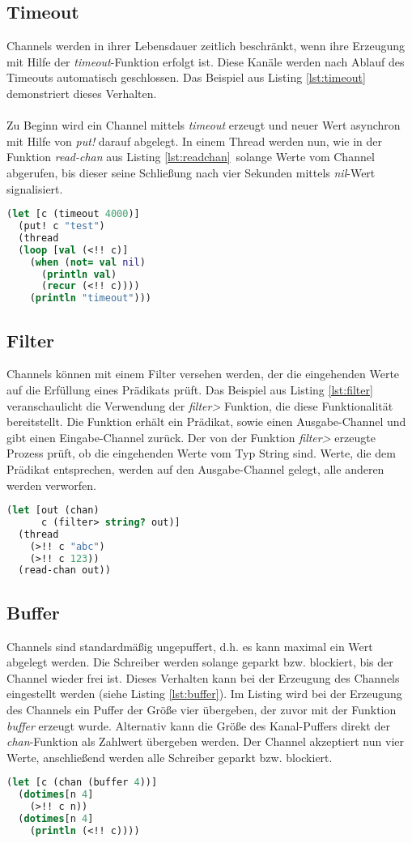 \subsection{Timeout}
Channels werden in ihrer Lebensdauer zeitlich beschränkt, wenn ihre Erzeugung mit Hilfe der \textit{timeout}-Funktion erfolgt ist. Diese Kanäle werden nach Ablauf des Timeouts automatisch geschlossen. Das Beispiel aus Listing \ref{lst:timeout} demonstriert dieses Verhalten.\\
\\
Zu Beginn wird ein Channel mittels \textit{timeout} erzeugt und neuer Wert asynchron mit Hilfe von \textit{put!} darauf abgelegt. In einem Thread werden nun, wie in der Funktion \textit{read-chan} aus Listing \ref{lst:readchan}\ solange Werte vom Channel abgerufen, bis dieser seine Schließung nach vier Sekunden mittels \textit{nil}-Wert signalisiert.
\begin{lstlisting}[language=Clojure,caption=Timeout,label=lst:timeout]
(let [c (timeout 4000)]
  (put! c "test")
  (thread
  (loop [val (<!! c)]
    (when (not= val nil)
      (println val)
      (recur (<!! c))))
    (println "timeout")))
\end{lstlisting}
\subsection{Filter}
Channels können mit einem Filter versehen werden, der die eingehenden Werte auf die Erfüllung eines Prädikats prüft. Das Beispiel aus Listing \ref{lst:filter} veranschaulicht die Verwendung der \textit{filter>} Funktion, die diese Funktionalität bereitstellt. Die Funktion erhält ein Prädikat, sowie einen Ausgabe-Channel und gibt einen Eingabe-Channel zurück. Der von der Funktion \textit{filter>} erzeugte Prozess prüft, ob die eingehenden Werte vom Typ String sind. Werte, die dem Prädikat entsprechen, werden auf den Ausgabe-Channel gelegt, alle anderen werden verworfen.

\begin{lstlisting}[language=Clojure,caption=Filter,label=lst:filter]
(let [out (chan)
      c (filter> string? out)]
  (thread
    (>!! c "abc")
    (>!! c 123))
  (read-chan out))
\end{lstlisting}
\subsection{Buffer}
Channels sind standardmäßig ungepuffert, d.h. es kann maximal ein Wert abgelegt werden. Die Schreiber werden solange geparkt bzw. blockiert, bis der Channel wieder frei ist. Dieses Verhalten kann bei der Erzeugung des Channels eingestellt werden (siehe Listing \ref{lst:buffer}). Im Listing wird bei der Erzeugung des Channels ein Puffer der Größe vier übergeben, der zuvor mit der Funktion \textit{buffer} erzeugt wurde. Alternativ kann die Größe des Kanal-Puffers direkt der \textit{chan}-Funktion als Zahlwert übergeben werden. Der Channel akzeptiert nun vier Werte, anschließend werden alle Schreiber geparkt bzw. blockiert.
\begin{lstlisting}[language=Clojure,caption=Buffer,label=lst:buffer]
(let [c (chan (buffer 4))]
  (dotimes[n 4]
    (>!! c n))
  (dotimes[n 4]
    (println (<!! c))))
\end{lstlisting}
\acresetall
